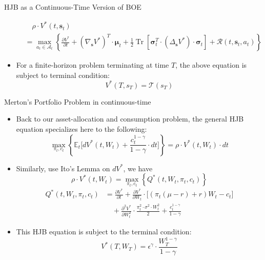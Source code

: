 \documentclass[UTF8, 10pt]{beamer}
\begin{document}
\begin{CJK*}{UTF8}{gbsn}
\begin{frame}{HJB as a Continuous-Time Version of BOE}
\begin{itemize}
			$$
			\begin{aligned}	
			&\quad\rho \cdot V^{*}\left(t, \boldsymbol{s}_{t}\right)
			\\&=\max _{a_{t} \in \mathcal{A}_{t}}\left\{\frac{\partial V^{*}}{\partial t}+\left(\nabla_{\boldsymbol{s}} V^{*}\right)^{T} \cdot \boldsymbol{\mu}_{t}+\frac{1}{2} \operatorname{Tr}\left[\boldsymbol{\sigma}_{t}^{T} \cdot\left(\Delta_{\boldsymbol{s}} V^{*}\right) \cdot \boldsymbol{\sigma}_{t}\right]+\mathcal{R}\left(t, \boldsymbol{s}_{t}, a_{t}\right)\right\}
			\end{aligned}
			$$
		\item For a finite-horizon problem terminating at time $T$, the above equation is subject to \alert{terminal condition}:
			$$
			V^{*}\left(T, s_{T}\right)=\mathcal{T}\left(s_{T}\right)
			$$
	\end{itemize}
\end{frame}
\begin{frame}{Merton's Portfolio Problem in continuous-time}
	\begin{itemize}
		\item Back to our asset-allocation and consumption problem, the general \alert{HJB equation} specializes here to the following:
			$$
			\max _{\pi_{t}, c_{t}}\left\{\mathbb{E}_{t}\Big[d V^{*}\left(t, W_{t}\right)+\frac{c_{t}^{1-\gamma}}{1-\gamma} \cdot d t\Big]\right\}=\rho \cdot V^{*}\left(t, W_{t}\right) \cdot d t
			$$
		\item Similarly, use Ito's Lemma on $d V^*$, we have
			$$
			\rho \cdot V^{*}\left(t, W_{t}\right)
			=\max _{\pi_{t}, c_{t}}\left\{ Q^*(t,W_t,\pi_t, c_t)
			\right\}
			$$
		$$
		\begin{aligned}
			Q^*(t,W_t,\pi_t, c_t)
			&=\frac{\partial V^{*}}{\partial t}+\frac{\partial V^{*}}{\partial W_{t}} \cdot\Big[\left(\pi_{t}(\mu-r)+r\right) W_{t}-c_{t}\Big]
			\\&\quad+\frac{\partial^{2} V^{*}}{\partial W_{t}^{2}} \cdot \frac{\pi_{t}^{2} \cdot \sigma^{2} \cdot W_{t}^{2}}{2}+\frac{c_{t}^{1-\gamma}}{1-\gamma}
		\end{aligned}
		$$
		\item This HJB equation is subject to the \alert{terminal condition}: 
		$$V^{*}\left(T, W_{T}\right)=\epsilon^{\gamma} \cdot \frac{W_{T}^{1-\gamma}}{1-\gamma}$$
	\end{itemize}
\end{frame}


\end{CJK*}
\end{document}
